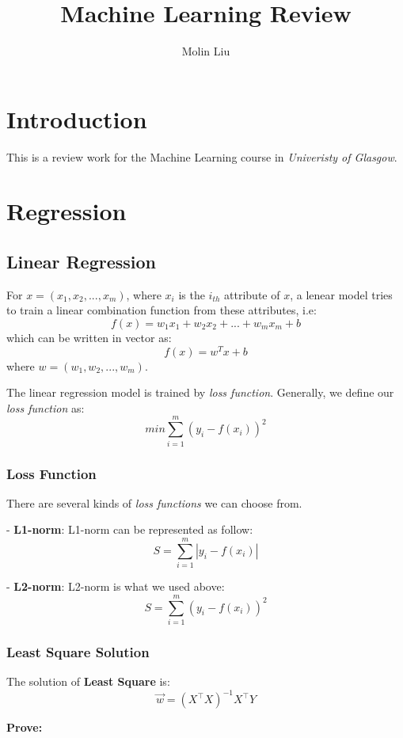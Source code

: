 \documentclass[12pt]{article}
\title{
    Machine Learning Review\\
}
\author{Molin Liu}
\begin{document}
\maketitle

\section*{Introduction}

This is a review work for the Machine Learning course in
\textit{Univeristy of Glasgow}.

\section{Regression}

\subsection{Linear Regression}

For $x = (x_1, x_2, ..., x_m)$, 
where $x_i$ is the $i_{th}$ attribute of $x$, 
a lenear model tries to train a linear combination function
from these attributes, i.e:
$$f(x) = w_1 x_1 + w_2 x_2 +...+ w_m x_m+b$$
which can be written in vector as:
$$f(x)=w^Tx+b$$
where $w=(w_1, w_2,...,w_m)$.

The linear regression model is trained by \textit{loss function}.
Generally, we define our \textit{loss function} as:
$$min\sum_{i=1}^{m}{(y_i-f(x_i))^2}$$

\subsubsection{Loss Function}

There are several kinds of \textit{loss functions} we can choose from.

- \textbf{L1-norm}: L1-norm can be represented as follow:
$$S=\sum_{i=1}^{m}\left|y_{i}-f\left(x_{i}\right)\right|$$

- \textbf{L2-norm}: L2-norm is what we used above:
$$S=\sum_{i=1}^{m}\left(y_{i}-f\left(x_{i}\right)\right)^{2}$$

\subsubsection{Least Square Solution}
The solution of \textbf{Least Square} is:
$$
\vec{w}=\left(X^{\top} X\right)^{-1} X^{\top} Y
$$

\textbf{Prove:}
\end{document}
